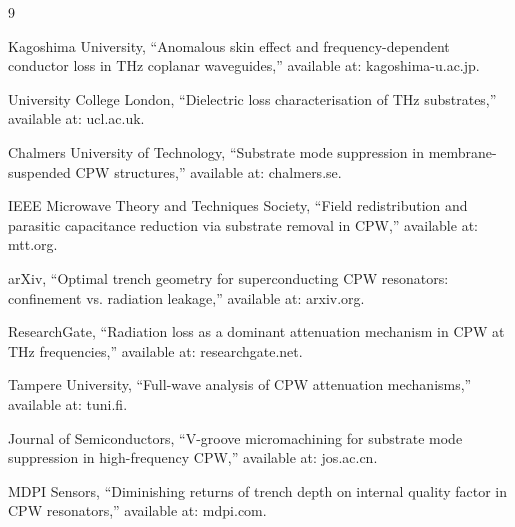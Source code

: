 \begin{thebibliography}{9}

Kagoshima University, ``Anomalous skin effect and frequency-dependent conductor loss in THz coplanar waveguides,'' available at: kagoshima-u.ac.jp.

University College London, ``Dielectric loss characterisation of THz substrates,'' available at: ucl.ac.uk.

Chalmers University of Technology, ``Substrate mode suppression in membrane-suspended CPW structures,'' available at: chalmers.se.

IEEE Microwave Theory and Techniques Society, ``Field redistribution and parasitic capacitance reduction via substrate removal in CPW,'' available at: mtt.org.

arXiv, ``Optimal trench geometry for superconducting CPW resonators: confinement vs. radiation leakage,'' available at: arxiv.org.

ResearchGate, ``Radiation loss as a dominant attenuation mechanism in CPW at THz frequencies,'' available at: researchgate.net.

Tampere University, ``Full-wave analysis of CPW attenuation mechanisms,'' available at: tuni.fi.

Journal of Semiconductors, ``V-groove micromachining for substrate mode suppression in high-frequency CPW,'' available at: jos.ac.cn.

MDPI Sensors, ``Diminishing returns of trench depth on internal quality factor in CPW resonators,'' available at: mdpi.com.

\end{thebibliography}

